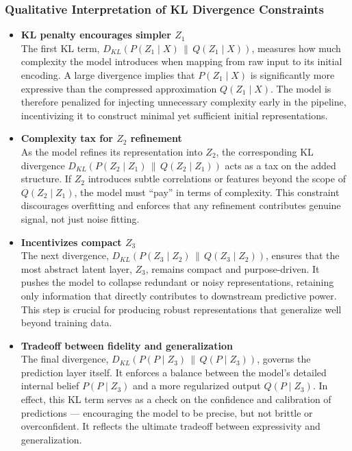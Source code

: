 \subsubsection*{Qualitative Interpretation of KL Divergence Constraints}

\begin{itemize}
    \item \textbf{KL penalty encourages simpler $Z_1$}\\
    The first KL term, $D_{KL}(P(Z_1 \mid X) \,\|\, Q(Z_1 \mid X))$, measures how much complexity the model introduces when mapping from raw input to its initial encoding. A large divergence implies that $P(Z_1 \mid X)$ is significantly more expressive than the compressed approximation $Q(Z_1 \mid X)$. The model is therefore penalized for injecting unnecessary complexity early in the pipeline, incentivizing it to construct minimal yet sufficient initial representations.

    \item \textbf{Complexity tax for $Z_2$ refinement}\\
    As the model refines its representation into $Z_2$, the corresponding KL divergence $D_{KL}(P(Z_2 \mid Z_1) \,\|\, Q(Z_2 \mid Z_1))$ acts as a tax on the added structure. If $Z_2$ introduces subtle correlations or features beyond the scope of $Q(Z_2 \mid Z_1)$, the model must “pay” in terms of complexity. This constraint discourages overfitting and enforces that any refinement contributes genuine signal, not just noise fitting.

    \item \textbf{Incentivizes compact $Z_3$}\\
    The next divergence, $D_{KL}(P(Z_3 \mid Z_2) \,\|\, Q(Z_3 \mid Z_2))$, ensures that the most abstract latent layer, $Z_3$, remains compact and purpose-driven. It pushes the model to collapse redundant or noisy representations, retaining only information that directly contributes to downstream predictive power. This step is crucial for producing robust representations that generalize well beyond training data.

    \item \textbf{Tradeoff between fidelity and generalization}\\
    The final divergence, $D_{KL}(P(P \mid Z_3) \,\|\, Q(P \mid Z_3))$, governs the prediction layer itself. It enforces a balance between the model’s detailed internal belief $P(P \mid Z_3)$ and a more regularized output $Q(P \mid Z_3)$. In effect, this KL term serves as a check on the confidence and calibration of predictions — encouraging the model to be precise, but not brittle or overconfident. It reflects the ultimate tradeoff between expressivity and generalization.
\end{itemize}









